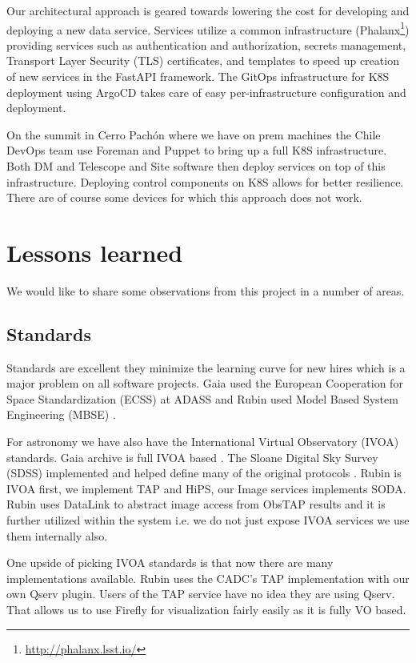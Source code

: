 \documentclass[11pt,twoside]{article}
\begin{document}
Our architectural approach is geared towards lowering the cost for developing and deploying a new data service.
Services utilize a common infrastructure (Phalanx\footnote{\url{http://phalanx.lsst.io/}}) providing services such as authentication and authorization, secrets management, Transport Layer Security (TLS) certificates, and templates to speed up creation of new services in the FastAPI framework.
The GitOps infrastructure for K8S deployment using ArgoCD takes care of easy per-infrastructure configuration and deployment.

On the summit in Cerro Pachón where we have on prem machines the Chile DevOps team use Foreman and Puppet to bring up a full K8S infrastructure.
Both DM and Telescope and Site software then deploy services on top of this infrastructure.
Deploying control components on K8S allows for better resilience.
There are of course some devices for which this approach does not work.


\section{Lessons learned}
We would like to share some observations from this project in a number of areas.
\subsection{Standards}
Standards are excellent they minimize the learning curve for new hires which is a major problem on all software projects.
Gaia used the European Cooperation for Space Standardization (ECSS)\citep{2007arXiv0712.0249O} at ADASS and
 Rubin used Model Based System Engineering (MBSE) \citep{2018SPIE10705E..0US}.

For astronomy we have also have the International Virtual Observatory (IVOA) standards. Gaia archive is full IVOA based \citep{2019ASPC..523..445S,2015scop.confE...8G}. The Sloane Digital Sky Survey (SDSS) implemented and helped define many of the original protocols \citep{2004AAS...20511301T}.
Rubin is IVOA first, we implement TAP and  HiPS,
our Image services implements SODA.
Rubin uses DataLink to abstract image access from ObsTAP results and it is further utilized within the system i.e. we do not just expose IVOA services we use them internally also.

One upside of picking IVOA standards is that now there are many implementations available.
Rubin uses the CADC's TAP implementation  with our own Qserv plugin.
Users of the TAP service have no idea they are using Qserv.
That allows us to use Firefly for visualization fairly easily as it is
fully VO based.
\end{document}
